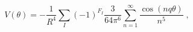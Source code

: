 \begin{equation}
\label{eq:WLpot}
V(\theta) = - \frac{1}{R^4} \sum_I (-1)^{F_I} \frac{3}{64 \pi^6}
\sum_{n=1}^{\infty}
\frac{\cos(n q \theta)}{n^5} \;,
\end{equation}

